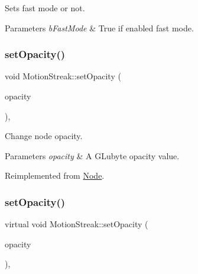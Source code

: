 Sets fast mode or not.


\begin{DoxyParams}{Parameters}
{\em b\+Fast\+Mode} & True if enabled fast mode. \\
\hline
\end{DoxyParams}
\mbox{\label{classMotionStreak_a7240b2a7e1340cf0139774421b7ca80e}} 
\subsubsection{\texorpdfstring{set\+Opacity()}{setOpacity()}\hspace{0.1cm}{\footnotesize\ttfamily [1/2]}}
{\footnotesize\ttfamily void Motion\+Streak\+::set\+Opacity (\begin{DoxyParamCaption}\item[{G\+Lubyte}]{opacity }\end{DoxyParamCaption})\hspace{0.3cm}{\ttfamily [override]}, {\ttfamily [virtual]}}

Change node opacity. 
\begin{DoxyParams}{Parameters}
{\em opacity} & A G\+Lubyte opacity value. \\
\hline
\end{DoxyParams}


Reimplemented from \hyperlink{classNode_ae41a9db63bfa3d466ee7c9d79c35352d}{Node}.

\mbox{\label{classMotionStreak_af5d9d6c438239621c6931d312a92fcec}} 
\subsubsection{\texorpdfstring{set\+Opacity()}{setOpacity()}\hspace{0.1cm}{\footnotesize\ttfamily [2/2]}}
{\footnotesize\ttfamily virtual void Motion\+Streak\+::set\+Opacity (\begin{DoxyParamCaption}\item[{G\+Lubyte}]{opacity }\end{DoxyParamCaption})\hspace{0.3cm}{\ttfamily [override]}, {\ttfamily [virtual]}}

